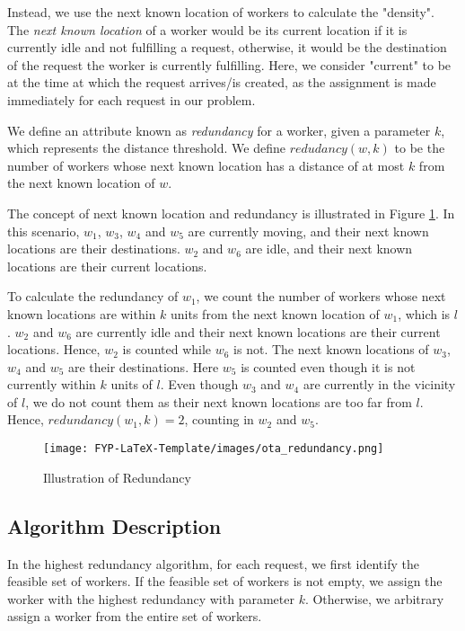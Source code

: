 \documentclass[urop]{socreport}
\begin{document}
Instead, we use the next known location of workers to calculate the "density".
The \textit{next known location} of a worker would be its current location if it is currently idle and not fulfilling a request, otherwise, it would be the destination of the request the worker is currently fulfilling. Here, we consider "current" to be at the time at which the request arrives/is created, as the assignment is made immediately for each request in our problem.

We define an attribute known as \textit{redundancy} for a worker, given a parameter $k$, which represents the distance threshold. We define $redudancy(w,k)$ to be the number of workers whose next known location has a distance of at most $k$ from the next known location of $w$.

The concept of next known location and redundancy is illustrated in Figure \ref{fig:redundancy}. In this scenario, $w_1$, $w_3$, $w_4$ and $w_5$ are currently moving, and their next known locations are their destinations. $w_2$ and $w_6$ are idle, and their next known locations are their current locations.

To calculate the redundancy of $w_1$, we count the number of workers whose next known locations are within $k$ units from the next known location of $w_1$, which is $l$. $w_2$ and $w_6$ are currently idle and their next known locations are their current locations. Hence, $w_2$ is counted while $w_6$ is not. The next known locations of $w_3$, $w_4$ and $w_5$ are their destinations. Here $w_5$ is counted even though it is not currently within $k$ units of $l$. Even though $w_3$ and $w_4$ are currently in the vicinity of $l$, we do not count them as their next known locations are too far from $l$. Hence, $redundancy(w_1, k) = 2$, counting in $w_2$ and $w_5$.

\begin{figure}[h]
    \centering
    \texttt{[image: FYP-LaTeX-Template/images/ota\_redundancy.png]}
    \caption{Illustration of Redundancy}
    \label{fig:redundancy}
\end{figure}

\subsection{Algorithm Description}

In the highest redundancy algorithm, for each request, we first identify the feasible set of workers. If the feasible set of workers is not empty, we assign the worker with the highest redundancy with parameter $k$. Otherwise, we arbitrary assign a worker from the entire set of workers. \\
\end{document}
